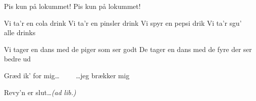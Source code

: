 \documentclass[danish]{article}
\begin{document}
\begin{song}
 Pis kun på lokummet!
            Pis kun på lokummet!

 Vi ta'r en cola drink
Vi ta'r en pinsler drink
Vi spyr en pepsi drik
Vi ta'r sgu' alle  drinks

Vi tager en dans med de piger
som ser godt
De tager en dans med de fyre 
der ser bedre ud

 Græd ik' for mig\ldots
            ~~~~\ldots{}jeg brækker mig

 Revy'n er slut\ldots {\em (ad lib.)}




\end{song}
\end{document}
